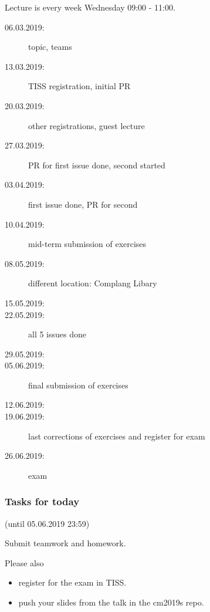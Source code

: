 


\date{5.6.2019}



\renewcommand{\enquote}[1]{\emph{``#1''}} %

\begin{frame}
	\titlepage
	\doclicenseThis
\end{frame}

\begin{frame}
	Lecture is every week Wednesday 09:00 - 11:00.

	\begin{description}
		\item[06.03.2019:] {\color{gray}topic, teams}
		\item[13.03.2019:] {\color{gray}TISS registration, initial PR}
		\item[20.03.2019:] {\color{gray}other registrations, guest lecture}
		\item[27.03.2019:] {\color{gray}PR for first issue done, second started}
		\item[03.04.2019:] {\color{gray}first issue done, PR for second}
		\item[10.04.2019:] {\color{gray}mid-term submission of exercises}
		\item[08.05.2019:] {\color{gray}different location: Complang Libary}
		\item[15.05.2019:]
		\item[22.05.2019:] {\color{gray}all 5 issues done}
		\item[29.05.2019:]
		\item[05.06.2019:] {\color{red}final submission of exercises}
		\item[12.06.2019:]
		\item[19.06.2019:] last corrections of exercises and register for exam
		\item[26.06.2019:] exam
	\end{description}
\end{frame}

\begin{assignment}
	\frametitle{Tasks for today}
	(until 05.06.2019 23:59)

	\begin{task}
	Submit teamwork and homework.
	\end{task}

	\vspace{1cm}
	\pause

	Please also
	\begin{itemize}[<+-| alert@+>]
	\item register for the exam in TISS.
	\item push your slides from the talk in the cm2019s repo.
	\end{itemize}
\end{assignment}

